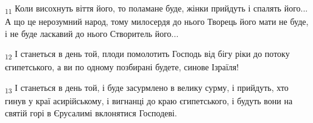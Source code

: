 \begin{tcolorbox}
\textsubscript{11} Коли висохнуть віття його, то поламане буде, жінки прийдуть і спалять його... А що це нерозумний народ, тому милосердя до нього Творець його мати не буде, і не буде ласкавий до нього Створитель його...
\end{tcolorbox}
\begin{tcolorbox}
\textsubscript{12} І станеться в день той, плоди помолотить Господь від бігу ріки до потоку єгипетського, а ви по одному позбирані будете, синове Ізраїля!
\end{tcolorbox}
\begin{tcolorbox}
\textsubscript{13} І станеться в день той, і буде засурмлено в велику сурму, і прийдуть, хто гинув у краї асирійському, і вигнанці до краю єгипетського, і будуть вони на святій горі в Єрусалимі вклонятися Господеві.
\end{tcolorbox}
